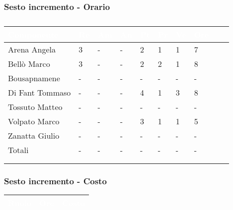 {{            \subsubsection{Sesto incremento - Orario} {
                \setlength{\freewidth}{\dimexpr\textwidth-30\tabcolsep}
            \renewcommand{\arraystretch}{1.0}
            \setlength{\aboverulesep}{0pt}
            \setlength{\belowrulesep}{0pt}
            \begin{longtable}{C{.3\freewidth} C{.1\freewidth} C{.1\freewidth} C{.1\freewidth} C{.1\freewidth} C{.1\freewidth} C{.1\freewidth} C{.1\freewidth} C{.1\freewidth} C{.3\freewidth}}
            \toprule
            \textcolor{white}{\textbf{Componente}}&
            \textcolor{white}{\textbf{Re}}&
            \textcolor{white}{\textbf{Am}}&
            \textcolor{white}{\textbf{An}}&
            \textcolor{white}{\textbf{Pt}}&
            \textcolor{white}{\textbf{Pr}}&
            \textcolor{white}{\textbf{Ve}}&
            \textcolor{white}{\textbf{Ore}} \\
            \toprule
            \endhead
    
            Arena Angela & 3 & - & - & 2 & 1 & 1 & 7\\      
            Bellò Marco & 3 & - & - & 2 & 2 & 1 & 8\\      
            Bousapnamene & - & - & - & - & - & - & -\\      
            Di Fant Tommaso & - & - & - & 4 & 1 & 3  & 8\\      
            Tossuto Matteo & - & - & - & - & - & -  & -\\      
            Volpato Marco & - & - & - & 3 & 1 & 1 &  5 \\      
            Zanatta Giulio & - & - & - & - & - & - & - \\      
            Totali & - & - & - & - & - & - & - \\
            \bottomrule
            \\
            \caption{}

            \end{longtable}
            }
            \subsubsection{Sesto incremento - Costo} {
                \setlength{\freewidth}{\dimexpr\textwidth-30\tabcolsep}
                \renewcommand{\arraystretch}{1.0}
                \centering
                \setlength{\aboverulesep}{0pt}
                \setlength{\belowrulesep}{0pt}
                \begin{longtable}{C{.4\freewidth} C{.2\freewidth} C{.2\freewidth}}
                \toprule
                \textcolor{white}{\textbf{Ruolo}}&
                \textcolor{white}{\textbf{Ore}}&
                \textcolor{white}{\textbf{Costo}}\\
                \toprule
                \endhead
          

\end{longtable}}}}
